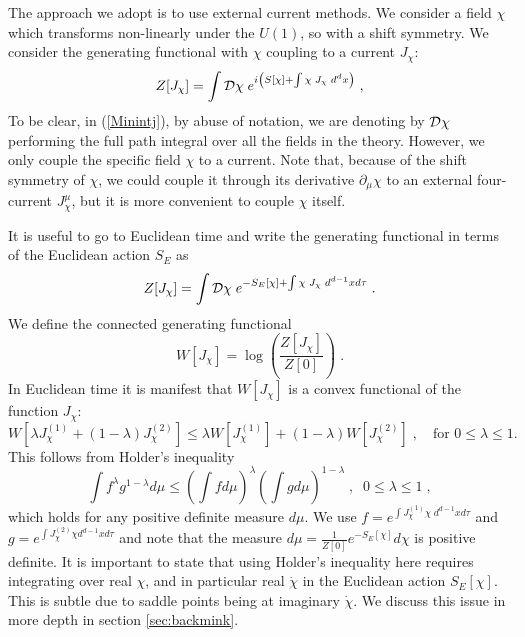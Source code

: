 \documentclass[11pt]{article}
\numberwithin{equation}{section}
\newcommand{\be}{\begin{equation}} \newcommand{\ee}{\end{equation}}
\begin{document}
The approach we adopt is to use external current methods. We consider a field $\chi$ which transforms non-linearly under the $U(1)$, so with a shift symmetry. We consider the generating functional with $\chi$ coupling to a current $J_{\chi}$:
\be
	Z[J_{\chi}] = \int {\cal D}\chi\; e^{i\left( S[\chi] + \int \chi \; J_{\chi} \;d^dx \right)} \;,
	\label{Minintj}
\ee
To be clear, in (\ref{Minintj}), by abuse of notation, we are denoting by ${\cal D}\chi$ performing the full path integral over all the fields in the theory. However, we only couple the specific field $\chi$ to a current.
Note that, because of the shift symmetry of $\chi$, we could couple it through its derivative $\partial_{\mu}\chi$ to  an external four-current $J_{\chi}^{\mu}$, but it is more convenient to couple $\chi$ itself. 

It is useful to go to Euclidean time and write the generating functional in terms of the Euclidean action $S_E$ as  
\be
	Z[J_{\chi}] = \int {\cal D}\chi \;e^{-S_E[\chi] + \int \chi \; J_{\chi} \;d^{d-1}x d\tau} \;.
	\label{intj}
\ee
We define the connected generating functional
	\be
	W[J_{\chi}] = \log \left( \frac{Z[J_{\chi}]}{Z[0]} \right) \;.
	\ee
In Euclidean time it is manifest that $W[J_\chi]$ is a convex functional of the function $J_\chi$:
	\be
	W[\lambda J^{(1)}_{\chi} + (1-\lambda) J^{(2)}_{\chi} ] \leq \lambda W[J^{(1)}_{\chi}] + (1-\lambda) W[J^{(2)}_{\chi}] \;, \hspace{1em} \text{for $0 \leq \lambda \leq 1$.}
	\ee 
	This follows from Holder's inequality
	\be
	\int f^{\lambda} g^{1-\lambda} d \mu \leq \left(\int f d\mu\right)^{\lambda}\left(\int g d\mu\right)^{1-\lambda} \;,\;\; 0 \leq \lambda \leq 1 \;,
	\label{holdinequ}
	\ee
	which holds for any positive definite measure $d\mu$. We use $f=e^{\int J^{(1)}_{\chi} \chi \;d^{d-1}x d\tau}$ and $g=e^{\int J^{(2)}_{\chi} \chi d^{d-1}x d\tau}$ and note that the measure $d\mu = \frac{1}{Z[0]}e^{-S_E[\chi]}d\chi$ is positive definite. It is important to state that using Holder's inequality here requires integrating over real $\chi$, and in particular real $\dot{\chi}$ in the Euclidean action $S_E[\chi]$. This is subtle due to saddle points being at imaginary $\dot{\chi}$. We discuss this issue in more depth in section \ref{sec:backmink}.
\end{document}

